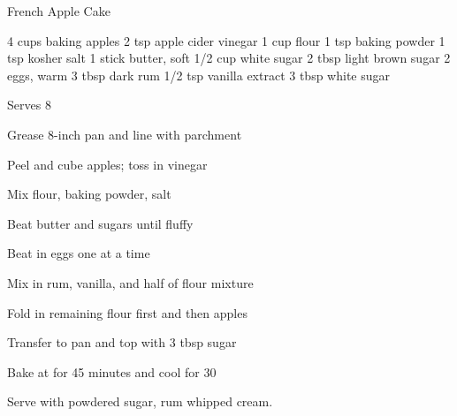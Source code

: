 \begin{denserecipe}{French Apple Cake}{}
\begin{ingredients}
4 cups baking apples
2 tsp apple cider vinegar
1 cup flour
1 tsp baking powder
1 tsp kosher salt
1 stick butter, soft
1/2 cup white sugar
2 tbsp light brown sugar
2 eggs, warm
3 tbsp dark rum
1/2 tsp vanilla extract
3 tbsp white sugar
\end{ingredients}
\nextcolumn
Serves 8
\begin{steps}
    \item Grease 8-inch pan and line with parchment
    \item Peel and cube apples; toss in vinegar
    \item Mix flour, baking powder, salt
    \item Beat butter and sugars until fluffy
    \item Beat in eggs one at a time
    \item Mix in rum, vanilla, and half of flour mixture
    \item Fold in remaining flour first and then apples
    \item Transfer to pan and top with 3 tbsp sugar
    \item Bake at  for 45 minutes and cool for 30
\end{steps}
Serve with powdered sugar, rum whipped cream.
\end{denserecipe}
